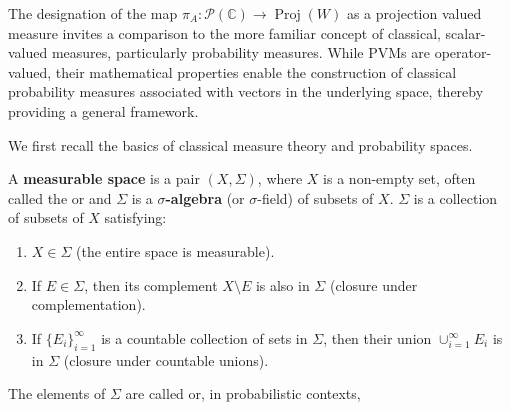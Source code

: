 The designation of the map $\pi_A : \mathcal{P}(\mathbb{C}) \longrightarrow \operatorname{Proj}(W)$ as a projection valued measure invites a comparison to the more familiar concept of classical, scalar-valued measures, particularly probability measures. While PVMs are operator-valued, their mathematical properties enable the construction of classical probability measures associated with vectors in the underlying space, thereby providing a general framework.

We first recall the basics of classical measure theory and probability spaces.

\begin{definition}
A \textbf{measurable space} is a pair $(X, \Sigma)$, where $X$ is a non-empty set, often called the  or  and $\Sigma$ is a \textbf{$\sigma$-algebra} (or $\sigma$-field) of subsets of $X$. $\Sigma$ is a collection of subsets of $X$ satisfying:
\begin{enumerate}
    \item $X \in \Sigma$ (the entire space is measurable).
    \item If $E \in \Sigma$, then its complement $X \setminus E$ is also in $\Sigma$ (closure under complementation).
    \item If $\{E_i\}_{i=1}^\infty$ is a countable collection of sets in $\Sigma$, then their union $\cup_{i=1}^\infty E_i$ is in $\Sigma$ (closure under countable unions).
\end{enumerate}
The elements of $\Sigma$ are called  or, in probabilistic contexts, 
\end{definition}

